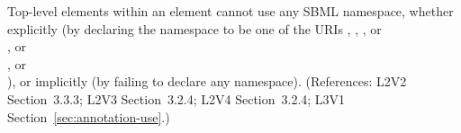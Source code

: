 Top-level elements within an  element cannot use any SBML
namespace, whether explicitly (by declaring the namespace to be one of the
URIs ,
, 
, or\\
, or\\
, or\\
), or implicitly (by failing
to declare any namespace).  (References: L2V2 Section~3.3.3; L2V3
Section~3.2.4; L2V4 Section~3.2.4; L3V1 Section~\ref{sec:annotation-use}.)

